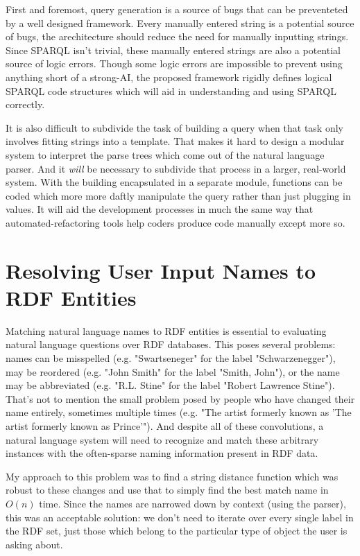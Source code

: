 \documentclass[11pt]{article}
\begin{document}
First and foremost, query generation is a source of bugs that can be preventeted by a well
designed framework. Every manually entered string is a potential source of bugs, the
arechitecture should reduce the need for manually inputting strings. Since SPARQL isn't
trivial, these manually entered strings are also a potential source
of logic errors. Though some logic errors are impossible to prevent using anything short of
a strong-AI, the proposed framework rigidly defines logical SPARQL code structures which
will aid in understanding and using SPARQL correctly. 

It is also difficult to subdivide the task of building a query when that task only
involves fitting strings into a template. That makes it hard to design a modular system to
interpret the parse trees which come out of the natural language parser. And it {\em will}
be necessary to subdivide that process in a larger, real-world system. With the building
encapsulated in a separate module, functions can be coded which more more daftly manipulate
the query rather than just plugging in values. It will aid the development processes in
much the same way that automated-refactoring tools help coders produce code manually except
more so.

\section{Resolving User Input Names to RDF Entities}

Matching natural language names to RDF entities is essential to evaluating
natural language questions over RDF databases. This poses several problems:
names can be misspelled (e.g. "Swartseneger" for the label "Schwarzenegger"), 
may be reordered (e.g. "John Smith" for the label "Smith, John"),
or the name may be abbreviated (e.g. "R.L. Stine" for the label "Robert Lawrence Stine").
That's not to mention the small problem posed by people who have
changed their name entirely, sometimes multiple times
(e.g. "The artist formerly known as 'The artist formerly known as Prince'").
And despite all of these convolutions, a natural language system will need to
recognize and match these arbitrary instances with the often-sparse naming information
present in RDF data.

My approach to this problem was to find a string distance function which was
robust to these changes and use that to simply
find the best match name in $O(n)$ time. Since the names are narrowed down by
context (using the parser), this was an acceptable solution: we don't need to iterate
over every single label in the RDF set, just those which belong to the particular
type of object the user is asking about.
\end{document}
